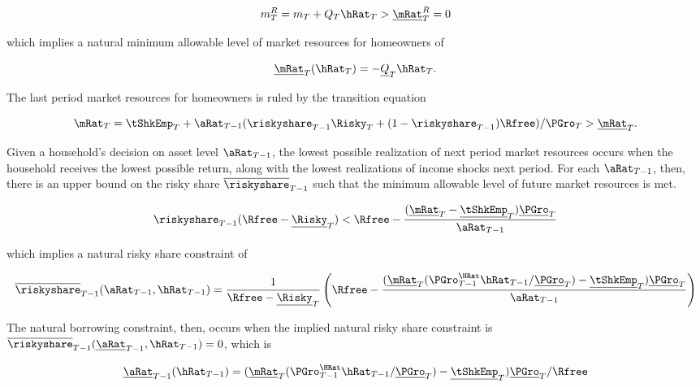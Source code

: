\documentclass[PortfolioChoiceWithRiskyHousing]{subfiles}
\begin{document}
\begin{equation}
	m_{T}^R = m_{T} + Q_{T} \hRat_{T} > \underline{\mRat}^R_{T} = 0
\end{equation}

which implies a natural minimum allowable level of market resources for homeowners of

\begin{equation}
	\underline{\mRat}_{T}(\hRat_{T}) = - \underline{Q}_{T} \hRat_{T}.
\end{equation}

The last period market resources for homeowners is ruled by the transition equation

\begin{equation}
	\mRat_{T} = \tShkEmp_{T} + \aRat_{T-1}(\riskyshare_{T-1}\Risky_{T} + (1-\riskyshare_{T-1})\Rfree)/\PGro_{T} > \underline{\mRat}_{T} .
\end{equation}

Given a household's decision on asset level $\aRat_{T-1}$, the lowest possible realization of next period market resources occurs when the household receives the lowest possible return, along with the lowest realizations of income shocks next period. For each $\aRat_{T-1}$, then, there is an upper bound on the risky share $\overline{\riskyshare}_{T-1}$ such that the minimum allowable level of future market resources is met.

\begin{equation}
	\riskyshare_{T-1}( \Rfree - \underline{\Risky}_{T}) < \Rfree - \frac{(\underline{\mRat}_{T} - \underline{\tShkEmp}_{T})\underline{\PGro}_{T} }{\aRat_{T-1}}
\end{equation}

which implies a natural risky share constraint of

\begin{equation}
	\overline{\riskyshare}_{T-1}(\aRat_{T-1}, \hRat_{T-1}) = \frac{1}{\Rfree - \underline{\Risky}_{T}} \left( \Rfree - \frac{(\underline{\mRat}_{T}(\PGro^{\HRat}_{T-1}\hRat_{T-1}/\underline{\PGro}_{T}) - \underline{\tShkEmp}_{T})\underline{\PGro}_{T} }{\aRat_{T-1}} \right)
\end{equation}

The natural borrowing constraint, then, occurs when the implied natural risky share constraint is $\overline{\riskyshare}_{T-1}(\underline{\aRat}_{T-1}, \hRat_{T-1}) =0$, which is

\begin{equation}
	\underline{\aRat}_{T-1}(\hRat_{T-1}) = (\underline{\mRat}_{T}(\PGro^{\HRat}_{T-1}\hRat_{T-1}/\underline{\PGro}_{T}) - \underline{\tShkEmp}_{T})\underline{\PGro}_{T} / \Rfree
\end{equation}
\end{document}
